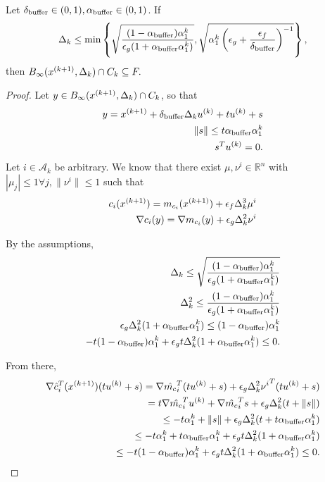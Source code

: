 \begin{theorem}
Let ${\delta_{\text{buffer}}} \in (0, 1), {\alpha_{\text{buffer}}} \in (0, 1)$.
If
\begin{align*}
\Delta_k \le \min\left\{
\sqrt{\frac{(1 - {\alpha_{\text{buffer}}}) \alpha_1^k}{\epsilon_g(1 + {\alpha_{\text{buffer}}}\alpha_1^k)}},
\sqrt{\alpha_1^k \left(\epsilon_g + \frac{\epsilon_f}{{\delta_{\text{buffer}}}}\right)^{-1}}
\right\},
\end{align*}
then $B_{\infty}({x}^{(k+1)}, \Delta_k)\cap C_k \subseteq {F}.$
\end{theorem}

\begin{proof}


Let $y \in B_{\infty}({x}^{(k+1)}, \Delta_k)\cap C_k$, so that
\begin{align*}
y = {x}^{(k+1)} + {\delta_{\text{buffer}}}\Delta_k u^{(k)} + tu^{(k)} + s \\
\|s\| \le t {\alpha_{\text{buffer}}}\alpha_1^k \\
s^Tu^{(k)} = 0.
\end{align*}
Let $i \in \mathcal A_k$ be arbitrary.
We know that there exist $\mu,\nu^i\in\mathbb R^n$ with $|\mu_j| \le 1\forall j, \|\nu^i\|\le 1$ such that
\begin{align*}
c_i({x}^{(k+1)}) = m_{c_i}({x}^{(k+1)}) + \epsilon_f \Delta_k^3 \mu^i \\
\nabla c_i(y) = \nabla m_{c_i}(y) + \epsilon_g \Delta_k^2 \nu^i
\end{align*}


By the assumptions,
\begin{align*}
\Delta_k \le \sqrt{\frac{(1 - {\alpha_{\text{buffer}}}) \alpha_1^k}{\epsilon_g(1 + {\alpha_{\text{buffer}}}\alpha_1^k)}}\\
\Delta_k^2  \le \frac{(1 - {\alpha_{\text{buffer}}}) \alpha_1^k}{\epsilon_g(1 + {\alpha_{\text{buffer}}}\alpha_1^k)}\\
\epsilon_g \Delta_k^2 (1 + {\alpha_{\text{buffer}}}\alpha_1^k) \le (1 - {\alpha_{\text{buffer}}}) \alpha_1^k\\
-t(1 - {\alpha_{\text{buffer}}}) \alpha_1^k + \epsilon_g t\Delta_k^2 (1 + {\alpha_{\text{buffer}}}\alpha_1^k) \le 0.
\end{align*}

From there,
\begin{align*}
\nabla \hat c_{i}^T({x}^{(k+1)})(tu^{(k)} + s) = 
\nabla \hat {m_c}_{i}^T(tu^{(k)} + s) + \epsilon_g \Delta_k^2 {\nu^i}^T(tu^{(k)} + s) \\
=t\nabla \hat {m_c}_{i}^Tu^{(k)} + \nabla \hat {m_c}_{i}^Ts + \epsilon_g \Delta_k^2 (t + \|s\|) \\
\le -t \alpha_1^k + \|s\| + \epsilon_g \Delta_k^2 (t + t {\alpha_{\text{buffer}}}\alpha_1^k) \\
\le -t \alpha_1^k + t {\alpha_{\text{buffer}}} \alpha_1^k  + \epsilon_g t\Delta_k^2 (1 + {\alpha_{\text{buffer}}}\alpha_1^k) \\
\le -t(1 - {\alpha_{\text{buffer}}}) \alpha_1^k  + \epsilon_g t\Delta_k^2 (1 + {\alpha_{\text{buffer}}}\alpha_1^k) \le 0.
\end{align*}



\end{proof}

